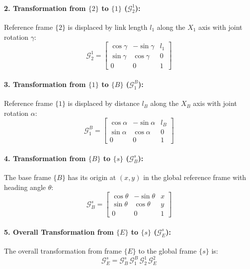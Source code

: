 \begin{enumerate}[label=\textbf{(\alph*)}]
    \paragraph{2. Transformation from $\{2\}$ to $\{1\}$ ($\mathcal{G}_2^1$):}
    Reference frame $\{2\}$ is displaced by link length $l_1$ along the $X_1$ axis with joint rotation $\gamma$:
    \begin{equation}
        \mathcal{G}_2^1 = \begin{bmatrix}
            \cos\gamma & -\sin\gamma & l_1 \\
            \sin\gamma & \cos\gamma & 0 \\
            0 & 0 & 1
        \end{bmatrix}
    \end{equation}

    \paragraph{3. Transformation from $\{1\}$ to $\{B\}$ ($\mathcal{G}_1^B$):}
    Reference frame $\{1\}$ is displaced by distance $l_B$ along the $X_B$ axis with joint rotation $\alpha$:
    \begin{equation}
        \mathcal{G}_1^B = \begin{bmatrix}
            \cos\alpha & -\sin\alpha & l_B \\
            \sin\alpha & \cos\alpha & 0 \\
            0 & 0 & 1
        \end{bmatrix}
    \end{equation}

    \paragraph{4. Transformation from $\{B\}$ to $\{s\}$ ($\mathcal{G}_B^s$):}
    The base frame $\{B\}$ has its origin at $(x, y)$ in the global reference frame with heading angle $\theta$:
    \begin{equation}
        \mathcal{G}_B^s = \begin{bmatrix}
            \cos\theta & -\sin\theta & x \\
            \sin\theta & \cos\theta & y \\
            0 & 0 & 1
        \end{bmatrix}
    \end{equation}

    \paragraph{5. Overall Transformation from $\{E\}$ to $\{s\}$ ($\mathcal{G}_E^s$):}
    The overall transformation from frame $\{E\}$ to the global frame $\{s\}$ is:
    \begin{equation}
        \mathcal{G}_E^s = \mathcal{G}_B^s \, \mathcal{G}_1^B \, \mathcal{G}_2^1 \, \mathcal{G}_E^2
    \end{equation}


\end{enumerate}
